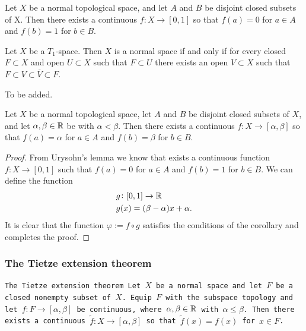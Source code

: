 \documentclass[11pt,a4paper]{article}
\begin{document}
\begin{lemma}\label{lem:urysohn}
  Let $X$ be a normal topological space, 
  and let $A$ and $B$ be disjoint closed subsets of X.
  Then there exists a continuous $f \colon X \to [0,1]$
  so that $f(a) = 0$ for $a \in A$ and $f(b) = 1$ for $b \in B$.
\end{lemma}

\begin{lemma}
  Let $X$ be a $T_1$-space. Then $X$ is a normal space if and only if
  for every closed $F \subset X$ and open $U \subset X$ such that
  $F \subset U$ there exists an open $V \subset X$ such that
  $F \subset V \subset \overline{V} \subset F$.
\end{lemma}

\begin{proofof}{}
  To be added.
\end{proofof}

\begin{corollary}
  Let $X$ be a normal topological space, let $A$ and $B$ be disjoint closed 
  subsets of $X$, and let $\alpha, \beta \in \mathbb{R}$ be with $\alpha < \beta$.
  Then there exists a continuous $f \colon X \to [\alpha, \beta]$ 
  so that $f(a) = \alpha$ for $a \in A$ and $f(b) = \beta$ for $b \in B$.
\end{corollary}

\begin{proof}
  From Urysohn's lemma we know that exists a continuous function 
  $f \colon X \to [0,1]$ such that $f(a) = 0$ for $a \in A$ and
  $f(b) = 1$ for $b \in B$. We can define the function
  \begin{align*}
    &g \colon [0,1] \to \mathbb{R} \\
    &g(x) = (\beta - \alpha)x + \alpha.
  \end{align*}
  It is clear that the function $\varphi := f \circ g$ satisfies the
  conditions of the corollary and completes the proof.
\end{proof}

\subsubsection{The Tietze extension theorem}

\begin{theorem}\label{thm:tietze}\tt{The Tietze extension theorem}
  Let $X$ be a normal space and let $F$ be a closed nonempty subset of $X$.
  Equip $F$ with the subspace topology
  and let $f \colon F \to [\alpha, \beta]$ be continuous,
  where $\alpha, \beta \in \mathbb{R}$ with $\alpha \le \beta$.
  Then there exists a continuous $\tilde{f} \colon X \to [\alpha, \beta]$
  so that $\tilde{f}(x) = f(x)$ for $x \in F$.
\end{theorem}
\end{document}
